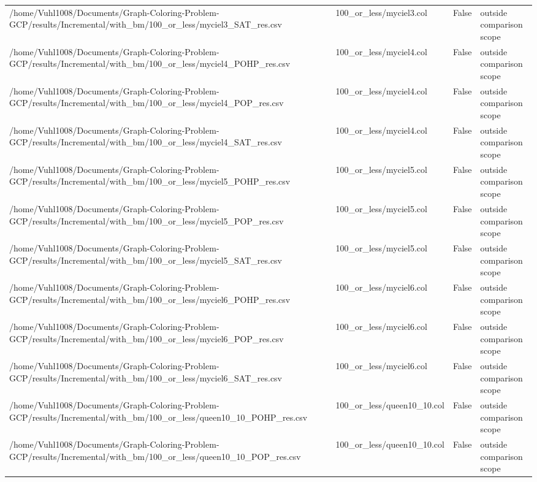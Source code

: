 \begin{table}[htbp]
\begin{tabular}{llll}
/home/Vuhl1008/Documents/Graph-Coloring-Problem-GCP/results/Incremental/with\_bm/100\_or\_less/myciel3\_SAT\_res.csv & 100\_or\_less/myciel3.col & False & outside comparison scope \\
/home/Vuhl1008/Documents/Graph-Coloring-Problem-GCP/results/Incremental/with\_bm/100\_or\_less/myciel4\_POHP\_res.csv & 100\_or\_less/myciel4.col & False & outside comparison scope \\
/home/Vuhl1008/Documents/Graph-Coloring-Problem-GCP/results/Incremental/with\_bm/100\_or\_less/myciel4\_POP\_res.csv & 100\_or\_less/myciel4.col & False & outside comparison scope \\
/home/Vuhl1008/Documents/Graph-Coloring-Problem-GCP/results/Incremental/with\_bm/100\_or\_less/myciel4\_SAT\_res.csv & 100\_or\_less/myciel4.col & False & outside comparison scope \\
/home/Vuhl1008/Documents/Graph-Coloring-Problem-GCP/results/Incremental/with\_bm/100\_or\_less/myciel5\_POHP\_res.csv & 100\_or\_less/myciel5.col & False & outside comparison scope \\
/home/Vuhl1008/Documents/Graph-Coloring-Problem-GCP/results/Incremental/with\_bm/100\_or\_less/myciel5\_POP\_res.csv & 100\_or\_less/myciel5.col & False & outside comparison scope \\
/home/Vuhl1008/Documents/Graph-Coloring-Problem-GCP/results/Incremental/with\_bm/100\_or\_less/myciel5\_SAT\_res.csv & 100\_or\_less/myciel5.col & False & outside comparison scope \\
/home/Vuhl1008/Documents/Graph-Coloring-Problem-GCP/results/Incremental/with\_bm/100\_or\_less/myciel6\_POHP\_res.csv & 100\_or\_less/myciel6.col & False & outside comparison scope \\
/home/Vuhl1008/Documents/Graph-Coloring-Problem-GCP/results/Incremental/with\_bm/100\_or\_less/myciel6\_POP\_res.csv & 100\_or\_less/myciel6.col & False & outside comparison scope \\
/home/Vuhl1008/Documents/Graph-Coloring-Problem-GCP/results/Incremental/with\_bm/100\_or\_less/myciel6\_SAT\_res.csv & 100\_or\_less/myciel6.col & False & outside comparison scope \\
/home/Vuhl1008/Documents/Graph-Coloring-Problem-GCP/results/Incremental/with\_bm/100\_or\_less/queen10\_10\_POHP\_res.csv & 100\_or\_less/queen10\_10.col & False & outside comparison scope \\
/home/Vuhl1008/Documents/Graph-Coloring-Problem-GCP/results/Incremental/with\_bm/100\_or\_less/queen10\_10\_POP\_res.csv & 100\_or\_less/queen10\_10.col & False & outside comparison scope \\

\end{tabular}
\end{table}
